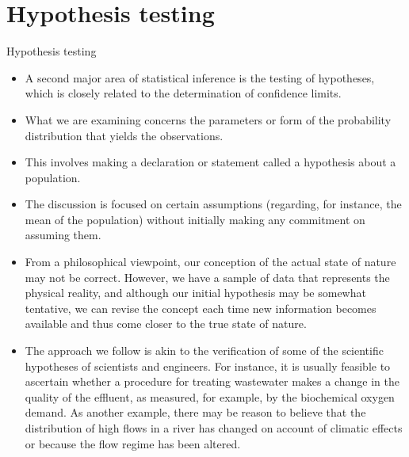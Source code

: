 \documentclass[8pt]{beamer}
\renewcommand{\emph}[1]{\textcolor{myorange}{#1}}
\begin{document}
\section{Hypothesis testing}
\begin{frame}{Hypothesis testing}
    \begin{itemize}
        \item A second major area of statistical inference is the \alert{testing of hypotheses}, which is closely related to the determination of \emph{confidence limits}. 
        \item What we are examining concerns the parameters or form of the probability distribution that yields the observations.
        \item This involves making a declaration or statement called a \alert{hypothesis} about a population.
        \item The discussion is focused on certain assumptions (regarding, for instance, the mean of the population) without initially making any commitment on assuming them.
        \item From a philosophical viewpoint, our conception of the actual state of nature may not be correct. However, we have a sample of data that represents the physical reality, and although our initial hypothesis may be somewhat tentative, we can revise the concept each time new information becomes available and thus come closer to the true state of nature.
        \item The approach we follow is akin to the verification of some of the scientific hypotheses of scientists and engineers. For instance, it is usually feasible to ascertain whether a procedure for treating wastewater makes a change in the quality of the effluent, as measured, for example, by the biochemical oxygen demand. As another example, there may be reason to believe that the distribution of high flows in a river has changed on account of climatic effects or because the flow regime has been altered.
    \end{itemize}
\end{frame}
\end{document}
